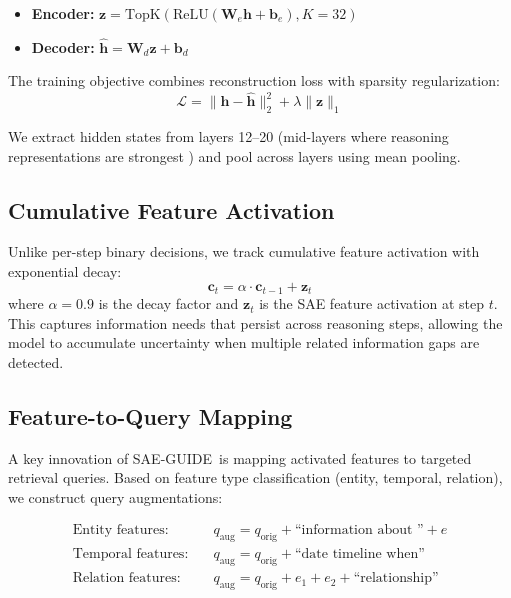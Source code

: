 \documentclass{article}
\newcommand{\ours}{SAE-GUIDE}
\begin{document}
\begin{itemize}
    \item \textbf{Encoder:} $\mathbf{z} = \text{TopK}(\text{ReLU}(\mathbf{W}_e \mathbf{h} + \mathbf{b}_e), K=32)$
    \item \textbf{Decoder:} $\hat{\mathbf{h}} = \mathbf{W}_d \mathbf{z} + \mathbf{b}_d$
\end{itemize}

The training objective combines reconstruction loss with sparsity regularization:
\begin{equation}
\mathcal{L} = \|\mathbf{h} - \hat{\mathbf{h}}\|_2^2 + \lambda \|\mathbf{z}\|_1
\end{equation}

We extract hidden states from layers 12--20 (mid-layers where reasoning representations are strongest \citep{yang2024latent}) and pool across layers using mean pooling.

\subsection{Cumulative Feature Activation}

Unlike per-step binary decisions, we track cumulative feature activation with exponential decay:
\begin{equation}
\mathbf{c}_t = \alpha \cdot \mathbf{c}_{t-1} + \mathbf{z}_t
\end{equation}
where $\alpha = 0.9$ is the decay factor and $\mathbf{z}_t$ is the SAE feature activation at step $t$. This captures information needs that persist across reasoning steps, allowing the model to accumulate uncertainty when multiple related information gaps are detected.

\subsection{Feature-to-Query Mapping}

A key innovation of \ours\ is mapping activated features to targeted retrieval queries. Based on feature type classification (entity, temporal, relation), we construct query augmentations:

\begin{align}
\text{Entity features:} & \quad q_{\text{aug}} = q_{\text{orig}} + \text{``information about ''} + e \\
\text{Temporal features:} & \quad q_{\text{aug}} = q_{\text{orig}} + \text{``date timeline when''} \\
\text{Relation features:} & \quad q_{\text{aug}} = q_{\text{orig}} + e_1 + e_2 + \text{``relationship''}
\end{align}
\end{document}
